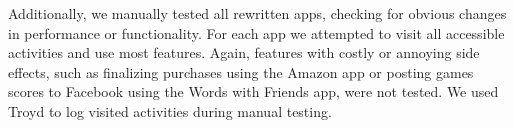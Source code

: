 \documentclass[preprint]{sig-alternate-10pt}
\newcommand{\code}[1]{\textsf{#1}}
\newcommand{\lib}{Mr.\ Hide\xspace}
\newcommand{\rewriter}{Dr.\ Android\xspace}
\newcommand{\troyd}{Troyd\xspace}
\begin{document}


Additionally, we 
manually tested all rewritten apps, checking for obvious changes in
performance or functionality.  For each app we attempted to visit all
accessible activities and use most features.  Again, features with
costly or annoying side effects, such as finalizing purchases using the Amazon
app or posting games scores to Facebook using the Words with Friends app, were
not tested.  
We used \troyd to log visited activities during manual testing.
\end{document}
